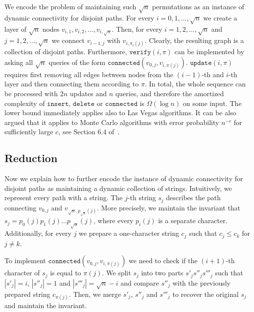 \documentclass[a4paper]{article}
\theoremstyle{remark}
\newcommand{\insertop}{\mathtt{insert}}
\newcommand{\deleteop}{\mathtt{delete}}
\newcommand{\connectedop}{\mathtt{connected}}
\newcommand{\updateop}{\mathtt{update}}
\newcommand{\verifyop}{\mathtt{verify}}
\begin{document}
We encode the problem of maintaining such $\sqrt{n}$ permutations
as an instance of dynamic connectivity for disjoint paths. For every $i=0,1,\ldots,\sqrt{n}$
we create a layer of $\sqrt{n}$ nodes $v_{i,1},v_{i,2},\ldots,v_{i,\sqrt{n}}$. Then, for every
$i=1,2,\ldots,\sqrt{n}$ and $j=1,2,\ldots,\sqrt{n}$ we connect $v_{i-1,j}$ with $v_{i,\pi_i(j)}$.
Clearly, the resulting graph is a collection of disjoint paths. Furthermore,
$\verifyop(i,\pi)$ can be implemented by asking all $\sqrt{n}$ queries of the form
$\connectedop(v_{0,j},v_{i,\pi(j)})$. $\updateop(i,\pi)$ requires first removing all edges
between nodes from the $(i-1)$-th and $i$-th layer and then connecting them
according to $\pi$. In total, the whole sequence can be processed with $2n$ updates
and $n$ queries, and therefore the amortized complexity of $\insertop$,
$\deleteop$ or $\connectedop$ is $\Omega(\log n)$ on some input. The lower bound
immediately applies also to Las Vegas algorithms. It can be also argued that it
applies to Monte Carlo algorithms with error probability $n^{-c}$ for sufficiently
large $c$, see Section 6.4 of~\cite{logarithmic}.

\subsection{Reduction}
Now we explain how to further encode the instance of dynamic connectivity for disjoint paths
as maintaining a dynamic collection of strings. Intuitively, we represent every path with
a string.
The $j$-th string $s_j$ describes the path connecting $v_{0,j}$ and $v_{\sqrt{n},p_{\sqrt{n}}(j)}$.
More precisely, we maintain the invariant that $s_j = p_0(j) p_1(j) \ldots p_{\sqrt{n}}(j)$,
where every $p_i(j)$ is a separate character. Additionally, for every $j$ we prepare
a one-character string $c_j$ such that $c_j\leq c_k$ for $j\neq k$.

To implement $\connectedop(v_{0,j},v_{i,\pi(j)})$ we need to check if the $(i+1)$-th character of $s_j$
is equal to $\pi(j)$. We split $s_j$ into two parts $s'_js''_js'''_j$ such that $|s'_j|=i$, $|s''_j|=1$
and $|s'''_j|=\sqrt{n}-i$
and compare $s''_j$ with the previously prepared string $c_{\pi(j)}$. Then,
we merge $s'_j$, $s''_j$ and $s'''_j$ to recover the original $s_j$ and maintain the invariant.
\end{document}

